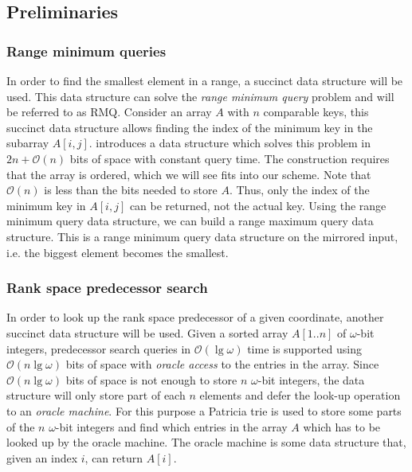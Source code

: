 \subsection{Preliminaries}

\subsubsection{Range minimum queries}
In order to find the smallest element in a range, a succinct data structure will be used. This data structure can solve the \emph{range minimum query} problem and will be referred to as RMQ.
Consider an array $A$ with $n$ comparable keys, this succinct data structure allows finding the index of the minimum key in the subarray $A[i,j]$. \citet{fischer} introduces a data structure which solves this problem in $2n + \mathcal{O}(n)$ bits of space with constant query time. The construction requires that the array is ordered, which we will see fits into our scheme. Note that $\mathcal{O}(n)$ is less than the bits needed to store $A$. Thus, only the index of the minimum key in $A[i,j]$ can be returned, not the actual key. Using the range minimum query data structure, we can build a range maximum query data structure. This is a range minimum query data structure on the mirrored input, i.e. the biggest element becomes the smallest.


\subsubsection{Rank space predecessor search}
In order to look up the rank space predecessor of a given coordinate, another succinct data structure will be used.
Given a sorted array $A[1..n]$ of $\omega$-bit integers, predecessor search queries in $\mathcal{O}(\lg \omega)$ time is supported using $\mathcal{O}(n \lg \omega)$ bits of space with \emph{oracle access} to the entries in the array. Since $\mathcal{O}(n \lg \omega)$ bits of space is not enough to store $n$ $\omega$-bit integers, the data structure will only store part of each $n$ elements and defer the look-up operation to an \emph{oracle machine}. For this purpose a Patricia trie \cite{morehaste} is used to store some parts of the $n$ $\omega$-bit integers and find which entries in the array $A$ which has to be looked up by the oracle machine. The oracle machine is some data structure that, given an index $i$, can return $A[i]$. 

